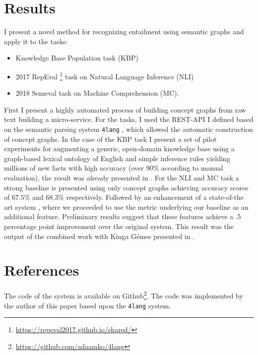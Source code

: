 \section{Results}
I present a novel method for recognizing entailment using semantic
graphs and apply it to the tasks:
\begin{itemize}
    \item Knowledge Base Population task (KBP)
    \item 2017 RepEval \footnote{\url{https://repeval2017.github.io/shared/}} task on Natural Language Inference (NLI)
    \item 2018 Semeval task on Machine
    Comprehension (MC).
\end{itemize}
First I present a highly automated process of building concept graphs from raw text building a micro-service.
For the tasks, I used the REST-API I defined based on the semantic parsing system \texttt{4lang} \cite{Recski:2016d}, which allowed the automatic construction of concept graphs.
In the case of the KBP task I present a set of pilot experiments for augmenting a generic, open-domain 
knowledge base using a graph-based lexical ontology of English and simple
inference rules yielding millions of new facts with high
accuracy (over 90\% according to manual evaluation), the result was already presented in \cite{Kovacs:2018}.
For the NLI and MC task a strong baseline is presented using only concept graphs achieving accuracy scores of $67.5\%$ and $68.3\%$ respectively.
Followed by an enhancement of a state-of-the art system
\cite{Wang:2018}, where we proceeded to use the metric underlying our baseline as an additional feature. Preliminary results suggest that these features achieve a .5 percentage point improvement over the original system. This result was the output of the combined work with Kinga G\'emes presented in \cite{Kovacs:2018b}.

\section{References}
The code of the system is available on Github\footnote{\url{https://github.com/adaamko/4lang}}. The code was implemented by the author of this paper based upon the \texttt{4lang} system.

